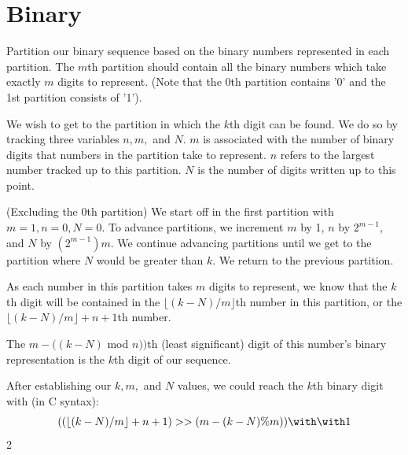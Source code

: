 \documentclass{article}
\begin{document}
\section{Binary}
Partition our binary sequence based on the binary numbers represented in each partition. The $m$th partition should contain all the binary numbers which take exactly $m$ digits to represent. (Note that the 0th partition contains '0' and the 1st partition consists of '1'). 
\par 
We wish to get to the partition in which the $k$th digit can be found. We do so by tracking three variables $n,m,$ and  $N$. $m$ is associated with the number of binary digits that numbers in the partition take to represent. $n$ refers to the largest number tracked up to this partition. $N$ is the number of digits written up to this point.
\par 
(Excluding the 0th partition) We start off in the first partition with $m=1, n=0,N=0$. To advance partitions, we increment $m$ by 1, $n$ by $2^{m-1}$, and $N$ by $(2^{m-1})m$. We continue advancing partitions until we get to the partition where $N$ would be greater than $k$. We return to the previous partition.
\par 
As each number in this partition takes $m$ digits to represent, we know that the $k$th digit will be contained in the $\lfloor (k-N)/m \rfloor$th number in this partition, or the $\lfloor (k-N)/m \rfloor + n +1$th number.
\par 
The $m-((k-N)$ mod $n))$th (least significant) digit of this number's binary representation is the $k$th digit of our sequence.
\par 
After establishing our $k,m,$ and $N$ values, we could reach the $k$th binary digit with (in C syntax):
\[( (\lfloor (k-N)/m \rfloor + n +1) >> (m-(k-N)\%m) ) \with\with   1 \]
2
\end{document}
